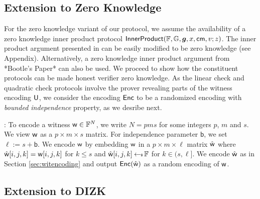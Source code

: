 \subsection{Extension to Zero Knowledge}
For the zero knowledge variant of our protocol, we assume the availability of a
zero knowledge inner product protocol
$\mathsf{InnerProduct}(\mathbb{F},\mathbb{G},\bm{g},x,\mathsf{cm},v;z)$. The inner product argument
presented in \cite[Section 3]{Bulletproofs} can be easily modified to be zero
knowledge (see Appendix). Alternatively, a zero knowledge inner product argument
from *Bootle's Paper* can also be used. We proceed to show how the constituent
protocols can be made honest verifier zero knowledge. As the linear check and
quadratic check protocols involve the prover revealing parts of the witness
encoding $\mathsf{U}$, we consider the encoding $\mathsf{Enc}$ to be a randomized encoding
with {\em bounded independence} property, as we desribe next.

: To encode a witness $\mathsf{w}\in \mathbb{F}^N$,
we write $N=pms$ for some integers $p$, $m$ and $s$. We view $\mathsf{w}$ as a
$p\times m\times s$ matrix. For independence parameter
$\mathsf{b}$, we set $\ell := s + \mathsf{b}$. We encode $\mathsf{w}$ by embedding
$\mathsf{w}$ in a $p\times m\times \ell$ matrix $\hat{\mathsf{w}}$ where
$\hat{\mathsf{w}}[i,j,k]=\mathsf{w}[i,j,k]$ for $k\leq s$ and $\hat{\mathsf{w}}[i,j,k]\hskip2.3pt{\gets\!\!\mbox{\tiny${\$}$\normalsize}}\,
\mathbb{F}$ for $k\in (s,\ell]$. We encode $\hat{\mathsf{w}}$ as in Section
\ref{sec:witencoding} and output $\mathsf{Enc}(\hat{\mathsf{w}})$ as a random encoding of
$\mathsf{w}$.  



\subsection{Extension to DIZK}


